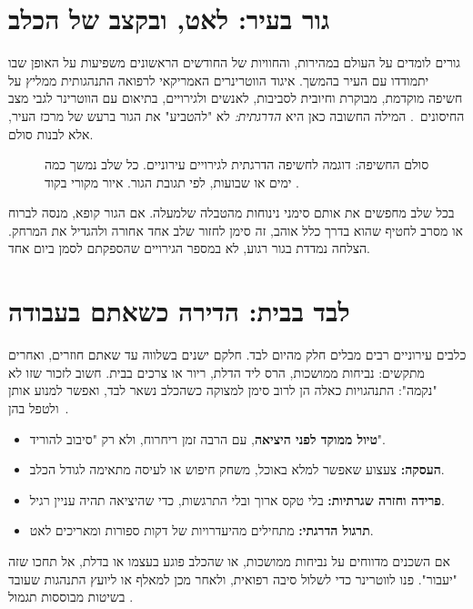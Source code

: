 \section{גור בעיר: לאט, ובקצב של הכלב}
גורים לומדים על העולם במהירות, והחוויות של החודשים הראשונים משפיעות על האופן שבו יתמודדו
עם העיר בהמשך. איגוד הווטרינרים האמריקאי לרפואה התנהגותית ממליץ על חשיפה מוקדמת, מבוקרת
וחיובית לסביבות, לאנשים ולגירויים, בתיאום עם הווטרינר לגבי מצב החיסונים~\cite{avsab-puppy}.
המילה החשובה כאן היא \emph{הדרגתית:} לא "להטביע" את הגור ברעש של מרכז העיר, אלא לבנות סולם.

\begin{figure}[h]
  \centering
  \resizebox{0.97\linewidth}{!}{}
  \caption{סולם החשיפה: דוגמה לחשיפה הדרגתית לגירויים עירוניים. כל שלב נמשך כמה ימים או שבועות,
  לפי תגובת הגור. איור מקורי בקוד .}
  \label{fig:ladder}
\end{figure}

בכל שלב מחפשים את אותם סימני נינוחות מהטבלה שלמעלה. אם הגור קופא, מנסה לברוח או מסרב לחטיף
שהוא בדרך כלל אוהב, זה סימן לחזור שלב אחד אחורה ולהגדיל את המרחק. הצלחה נמדדת בגור רגוע, לא
במספר הגירויים שהספקתם לסמן ביום אחד.

\section{לבד בבית: הדירה כשאתם בעבודה}
כלבים עירוניים רבים מבלים חלק מהיום לבד. חלקם ישנים בשלווה עד שאתם חוזרים, ואחרים מתקשים: נביחות
ממושכות, הרס ליד הדלת, ריור או צרכים בבית. חשוב לזכור שזו לא "נקמה": התנהגויות כאלה הן לרוב
סימן למצוקה כשהכלב נשאר לבד, ואפשר למנוע אותן ולטפל בהן~\cite{rspca-separation}.

\begin{tipbox}
\begin{itemize}
  \item \textbf{טיול ממוקד לפני היציאה}, עם הרבה זמן ריחרוח, ולא רק "סיבוב להוריד".
  \item \textbf{העסקה:} צעצוע שאפשר למלא באוכל, משחק חיפוש או לעיסה מתאימה לגודל הכלב.
  \item \textbf{פרידה וחזרה שגרתיות:} בלי טקס ארוך ובלי התרגשות, כדי שהיציאה תהיה עניין רגיל.
  \item \textbf{תרגול הדרגתי:} מתחילים מהיעדרויות של דקות ספורות ומאריכים לאט.
\end{itemize}
\end{tipbox}

\begin{knowbox}
אם השכנים מדווחים על נביחות ממושכות, או שהכלב פוגע בעצמו או בדלת, אל תחכו שזה "יעבור". פנו
לווטרינר כדי לשלול סיבה רפואית, ולאחר מכן למאלף או ליועץ התנהגות שעובד בשיטות מבוססות תגמול
\cite{avsab2021,rspca-separation}.
\end{knowbox}
